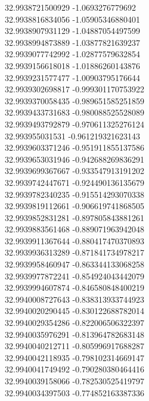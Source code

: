 {32.9938721500929	-1.0693276779692\\
32.9938816834056	-1.05905346880401\\
32.9938907931129	-1.04887054497599\\
32.9938994873889	-1.03877821639237\\
32.9939077742992	-1.02877579632854\\
32.9939156618018	-1.01886260143876\\
32.9939231577477	-1.00903795176644\\
32.9939302698817	-0.999301170753922\\
32.9939370058435	-0.989651585251859\\
32.9939433731683	-0.980088525528089\\
32.9939493792879	-0.970611325276124\\
32.993955031531	-0.961219321623143\\
32.9939603371246	-0.951911855137586\\
32.9939653031946	-0.942688269836291\\
32.9939699367667	-0.933547913191202\\
32.9939742447671	-0.924490136135679\\
32.9939782340235	-0.915514293070338\\
32.9939819112661	-0.906619741868505\\
32.9939852831281	-0.897805843881261\\
32.9939883561468	-0.889071963942048\\
32.9939911367644	-0.880417470370893\\
32.9939936313289	-0.871841734978217\\
32.9939958460947	-0.863344133068258\\
32.9939977872241	-0.854924043442079\\
32.9939994607874	-0.846580848400219\\
32.9940008727643	-0.838313933744923\\
32.9940020290445	-0.830122688782014\\
32.9940029354286	-0.822006506322397\\
32.9940035976291	-0.813964782683148\\
32.9940040212711	-0.805996917688287\\
32.9940042118935	-0.798102314669147\\
32.9940041749492	-0.790280380464416\\
32.9940039158066	-0.782530525419797\\
32.9940034397503	-0.774852163387336\\
}
